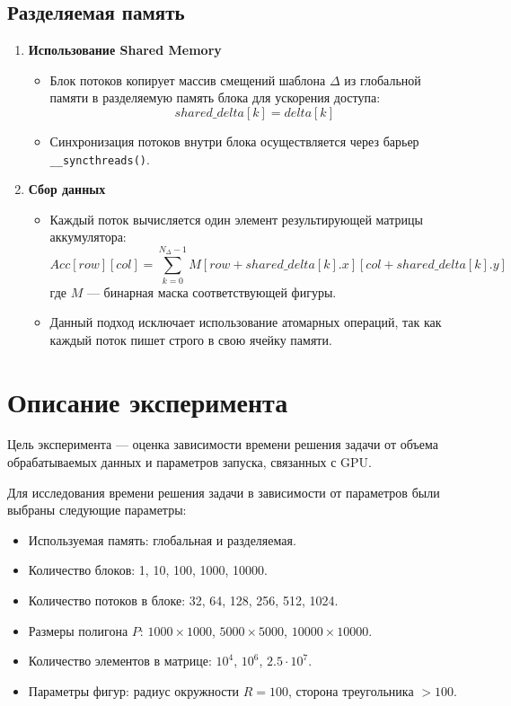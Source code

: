 \documentclass{article}[14pt]
\begin{document}
\subsection{Разделяемая память}

\begin{enumerate}
    \item \textbf{Использование Shared Memory}
    \begin{itemize}
        \item Блок потоков копирует массив смещений шаблона $\Delta$ из глобальной памяти в разделяемую память блока для ускорения доступа:
        \[ shared\_delta[k] = delta[k] \]
        \item Синхронизация потоков внутри блока осуществляется через барьер \texttt{\_\_syncthreads()}.
    \end{itemize}

    \item \textbf{Сбор данных}
    \begin{itemize}
        \item Каждый поток вычисляется один элемент результирующей матрицы аккумулятора:
        \[ Acc[row][col] = \sum_{k=0}^{N_{\Delta}-1} M[row + shared\_delta[k].x][col + shared\_delta[k].y] \]
        где $M$ — бинарная маска соответствующей фигуры.
        \item Данный подход исключает использование атомарных операций, так как каждый поток пишет строго в свою ячейку памяти.
    \end{itemize}
\end{enumerate}

\pagebreak

\section{Описание эксперимента}

Цель эксперимента — оценка зависимости времени решения задачи от объема 
обрабатываемых данных и параметров запуска, связанных с GPU.

Для исследования времени решения задачи в зависимости от параметров были выбраны следующие параметры:

\begin{itemize}
    \item Используемая память: глобальная и разделяемая.
    \item Количество блоков: 1, 10, 100, 1000, 10000.
    \item Количество потоков в блоке: 32, 64, 128, 256, 512, 1024.
    \item Размеры полигона $P$: $1000 \times 1000$, $5000 \times 5000$, $10000 \times 10000$.
    \item Количество элементов в матрице: $10^4$, $10^6$, $2.5 \cdot 10^7$.
    \item Параметры фигур: радиус окружности $R=100$, сторона треугольника $>100$.
\end{itemize}
\end{document}

